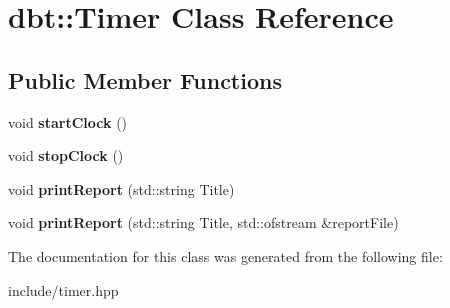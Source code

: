 \hypertarget{classdbt_1_1_timer}{}\section{dbt\+:\+:Timer Class Reference}
\label{classdbt_1_1_timer}
\subsection*{Public Member Functions}
\begin{DoxyCompactItemize}
\item 
void {\bfseries start\+Clock} ()\hypertarget{classdbt_1_1_timer_a124f1d8245c1b48d619ddeb043dce2e7}{}\label{classdbt_1_1_timer_a124f1d8245c1b48d619ddeb043dce2e7}

\item 
void {\bfseries stop\+Clock} ()\hypertarget{classdbt_1_1_timer_a3c2f9b5de315f148753705d65a7c7d7b}{}\label{classdbt_1_1_timer_a3c2f9b5de315f148753705d65a7c7d7b}

\item 
void {\bfseries print\+Report} (std\+::string Title)\hypertarget{classdbt_1_1_timer_aac30508ddc2c714aa3ab4698dcbdff47}{}\label{classdbt_1_1_timer_aac30508ddc2c714aa3ab4698dcbdff47}

\item 
void {\bfseries print\+Report} (std\+::string Title, std\+::ofstream \&report\+File)\hypertarget{classdbt_1_1_timer_a20836fe873af881827eb24baf0506d33}{}\label{classdbt_1_1_timer_a20836fe873af881827eb24baf0506d33}

\end{DoxyCompactItemize}


The documentation for this class was generated from the following file\+:\begin{DoxyCompactItemize}
\item 
include/timer.\+hpp\end{DoxyCompactItemize}

